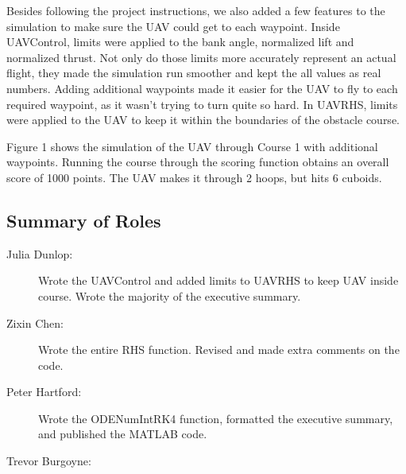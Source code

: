 \documentclass[12pt]{article}
\begin{document}
Besides following the project instructions, we also added a few features to the simulation to make sure the UAV could get to each waypoint. Inside UAVControl, limits were applied to the bank angle, normalized lift and normalized thrust. Not only do those limits more accurately represent an actual flight, they made the simulation run smoother and kept the all values as real numbers. Adding additional waypoints made it easier for the UAV to fly to each required waypoint, as it wasn’t trying to turn quite so hard. In UAVRHS, limits were applied to the UAV to keep it within the boundaries of the obstacle course. 

Figure 1 shows the simulation of the UAV through Course 1 with additional waypoints. Running the course through the scoring function obtains an overall score of 1000 points. The UAV makes it through 2 hoops, but hits 6 cuboids. 	




\pagebreak
\subsection*{\centering Summary of Roles}  

\begin{description}
\item[Julia Dunlop:] Wrote the UAVControl and added limits to UAVRHS to keep UAV inside course. Wrote the majority of the executive summary. 

\item[Zixin Chen:] Wrote the entire RHS function. Revised and made extra comments on the code.

\item[Peter Hartford:] Wrote the ODENumIntRK4 function, formatted the executive summary, and published the MATLAB code. 

\item[Trevor Burgoyne:]
\end{description} 
\end{document}
